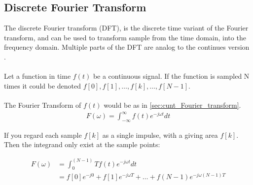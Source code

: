 \subsection{Discrete Fourier Transform}
%
%
%
The discrete Fourier transform (DFT), is the discrete time variant of the Fourier transform, and can be used to transform sample from the time domain, into the frequency domain.
Multiple parts of the DFT are analog to the continues version \cite{DFT_OX}.
\\\\
Let a function in time $f(t)$ be a continuous signal.
If the function is sampled N times it could be denoted
$f[0],f[1],\dots,f[k],\dots,f[N-1]$.
\\\\
The Fourier Transform of $f(t)$ would be as in \ref{sec:cunt_Fourier_transform}. 
\begin{align*}
	F(\omega) = \int_{-\infty}^\infty f(t)e^{-j\omega t} dt
\end{align*}

If you regard each sample $f[k]$ as a single impulse, with a giving area $f[k]$. Then the integrand only exist at the sample points:

\begin{align*}
	F(\omega) 
	&= \int_0^{(N-1)}T f(t) e^{-j\omega t}dt\\
	&= f[0]e^{-j0} + f[1]e^{-j\omega T} + \dots + f(N-1) e^{-j\omega(N-1)T}	
\end{align*}

